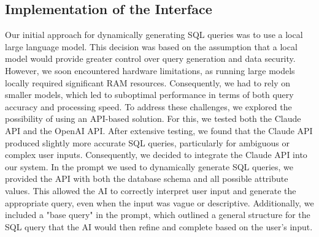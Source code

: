 \documentclass[../../submission.tex]{subfiles}
\begin{document}
\subsection{Implementation of the Interface}
Our initial approach for dynamically generating SQL queries was to use a local large language model. 
This decision was based on the assumption that a local model would provide greater control over query 
generation and data security. However, we soon encountered hardware limitations, as running large models 
locally required significant RAM resources. Consequently, we had to rely on smaller models, which led 
to suboptimal performance in terms of both query accuracy and processing speed. To address these challenges, 
we explored the possibility of using an API-based solution. For this, we tested both the Claude API and 
the OpenAI API. After extensive testing, we found that the Claude API produced slightly more accurate SQL 
queries, particularly for ambiguous or complex user inputs. Consequently, we decided to integrate the Claude API into our system. 
In the prompt we used to dynamically generate SQL queries, we provided the API with both the 
database schema and all possible attribute values. This allowed the AI to correctly interpret 
user input and generate the appropriate query, even when the input was vague or descriptive. 
Additionally, we included a "base query" in the prompt, which outlined a general structure for 
the SQL query that the AI would then refine and complete based on the user's input.
\end{document}
